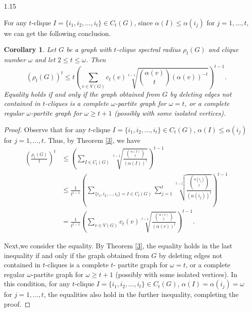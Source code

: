 \documentclass[preprint,12pt]{elsarticle1}
\newtheorem{cor}[thm]{Corollary}
\numberwithin{equation}{section}
\begin{document}
\begin{spacing}{1.15}



For any $t$-clique $I=\{i_1,i_2,\ldots,i_t\}\in C_t(G)$, since $\alpha(I)\le \alpha(i_j)$ for $j=1,\ldots,t$, we can get the following conclusion.

\begin{cor}\label{vertex}
Let $G$ be a graph with $t$-clique spectral radius $\rho_{t}(G)$ and clique number $\omega$ and let $2\le t\le\omega$. Then
$$\left( \rho_{t}(G)\right)^{t}\le t \left( \sum_{v\in V(G)} c_{t}(v) \sqrt[t-1]{\binom{\alpha(v)}{t}\left(\alpha(v)\right)^{-t}} \right)^{t-1}.$$
Equality holds if and only if the graph obtained from $G$ by deleting edges not contained in $t$-cliques is a complete $\omega$-partite graph for $\omega=t$, or a complete regular $\omega$-partite graph for $\omega\ge t+1$ (possibly with some isolated vertices).
\end{cor}

\begin{proof}
Observe that for any $t$-clique $I=\{i_1,i_2,\ldots,i_t\}\in C_t(G)$, $\alpha(I)\le \alpha(i_j)$ for $j=1,\ldots,t$. Thus, by Theorem \ref{3}, we have
\begin{align*}
\left( \frac{\rho_t(G)}{t} \right)^{t}& \le \left( \sum_{I\in C_t(G)} \sqrt[t-1]{\frac{\binom{\alpha(I)}{t}}{\left(\alpha(I)\right)^t}} \right)^{t-1}\\
& \le \frac{1}{t^{t-1}}\left( \sum_{\{i_1,i_2,\ldots,i_t\}=I\in C_t(G)}\sum_{j=1}^{t} \sqrt[t-1]{ \frac{\binom{\alpha(i_j)}{t}}{\left(\alpha(i_j)\right)^t}} \right)^{t-1}\\
& = \frac{1}{t^{t-1}} \left( \sum_{v\in V(G)} c_{t}(v) \sqrt[t-1]{\frac{\binom{\alpha(v)}{t}}{\left(\alpha(v)\right)^t}} \right)^{t-1}.
\end{align*}

Next,we consider the equality. By Theorem \ref{3}, the equality holds in the last inequality if and only if the graph obtained from $G$ by deleting edges not contained in $t$-cliques is a complete $t$- partite graph for $\omega=t$, or a complete regular $\omega$-partite graph for $\omega\ge t+1$ (possibly with some isolated vertices). In this condition, for any $t$-clique $I=\{i_1,i_2,\ldots,i_t\}\in C_t(G)$, $\alpha(I) =\alpha(i_j)=\omega$ for $j=1,\ldots,t$,  the equalities also hold in the further inequality, completing the proof.
\end{proof}


\end{spacing}
\end{document}
